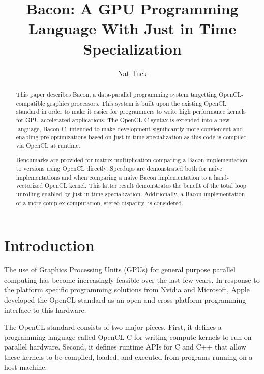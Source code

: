 \documentclass{llncs}
\begin{document}
\title{Bacon: A GPU Programming Language With Just in Time Specialization}

\author{Nat Tuck}


\maketitle


\begin{abstract}

This paper describes Bacon, a data-parallel programming system
targetting OpenCL-compatible graphics processors. This system is built
upon the existing OpenCL standard in order to make it easier for
programmers to write high performance kernels for GPU accelerated
applications. The OpenCL C syntax is extended into a new language,
Bacon C, intended to make development significantly more convienient
and enabling pre-optimizations based on just-in-time specialization as
this code is compiled via OpenCL at runtime.

Benchmarks are provided for matrix multiplication comparing a Bacon
implementation to versions using OpenCL directly. Speedups are
demonstrated both for naive implementations and when comparing a naive
Bacon implementation to a hand-vectorized OpenCL kernel. This latter
result demonstrates the benefit of the total loop unrolling enabled by
just-in-time specialization. Additionally, a Bacon implementation of a
more complex computation, stereo disparity, is considered.

\end{abstract}

\section{Introduction}

The use of Graphics Processing Units (GPUs) for general purpose
parallel computing has become increasingly feasible over the last few
years. In response to the platform specific programming solutions from
Nvidia and Microsoft, Apple developed the OpenCL standard as an open and
cross platform programming interface to this hardware.

The OpenCL standard\cite{opencl} consists of two major pieces. First,
it defines a programming language called OpenCL C for writing compute
kernels to run on parallel hardware. Second, it defines runtime APIs
for C and C++ that allow these kernels to be compiled, loaded, and
executed from programs running on a host machine.
\end{document}
